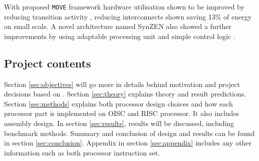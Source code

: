 With proposed \texttt{MOVE} framework hardware utilisation shown to be improved by reducing transition activity \autocite{1207041}, reducing interconnects shown saving 13\% of energy \autocite{6972455} on small scale. A novel architecture named SynZEN also showed a further improvements by using adaptable processing unit and simple control logic \autocite{6403142}.

\subsection{Project contents}
Section \ref{sec:objectives} will go more in details behind motivation and project decisions based on . Section \ref{sec:theory} explains theory and result predictions. Section \ref{sec:methods} explains both processor design choices and how each processor part is implemented on OISC and RISC processor. It also includes assembly design. In section \ref{sec:results}, results will be discussed, including benchmark methods. Summary and conclusion of design and results can be found in section \ref{sec:conclusion}. Appendix in section \ref{sec:appendix} includes any other information such as both processor instruction set.
